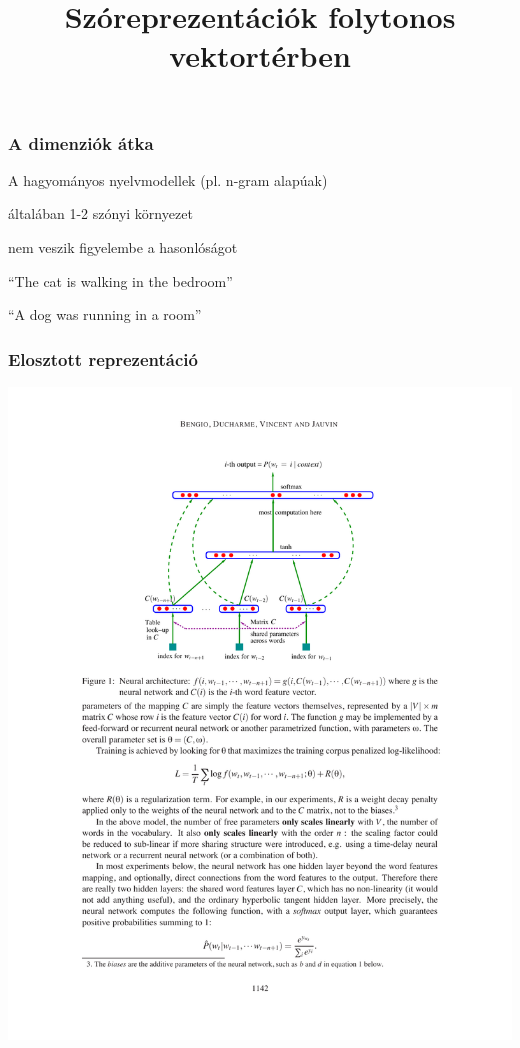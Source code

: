 \documentclass{beamer}
\title{Szóreprezentációk folytonos vektortérben}
\begin{document}
\begin{frame}
  \titlepage
\end{frame}

\begin{frame}
\frametitle{A dimenziók átka}
A hagyományos nyelvmodellek (pl. n-gram alapúak)

általában 1-2 szónyi környezet

nem veszik figyelembe a hasonlóságot

“The cat is walking in the bedroom” 

“A dog was running in a room”

\end{frame}

\begin{frame}
\frametitle{Elosztott reprezentáció}
\includegraphics[width=\linewidth]{bengio-neural-archtecture.pdf}
\end{frame}
\end{document}
